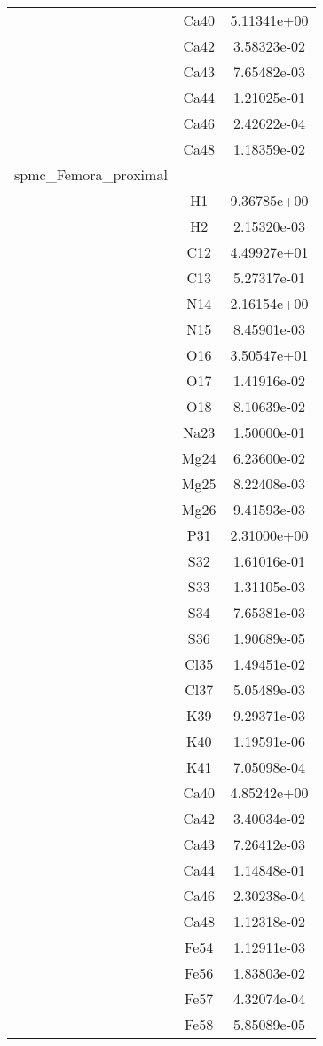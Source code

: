 \begin{centering}
\begin{longtable}{l c c}
& Ca40 & 5.11341e+00 \\ 
& Ca42 & 3.58323e-02 \\ 
& Ca43 & 7.65482e-03 \\ 
& Ca44 & 1.21025e-01 \\ 
& Ca46 & 2.42622e-04 \\ 
& Ca48 & 1.18359e-02 \\ 
\hline
spmc\_Femora\_proximal & & \\
\hline
& H1 & 9.36785e+00 \\ 
& H2 & 2.15320e-03 \\ 
& C12 & 4.49927e+01 \\ 
& C13 & 5.27317e-01 \\ 
& N14 & 2.16154e+00 \\ 
& N15 & 8.45901e-03 \\ 
& O16 & 3.50547e+01 \\ 
& O17 & 1.41916e-02 \\ 
& O18 & 8.10639e-02 \\ 
& Na23 & 1.50000e-01 \\ 
& Mg24 & 6.23600e-02 \\ 
& Mg25 & 8.22408e-03 \\ 
& Mg26 & 9.41593e-03 \\ 
& P31 & 2.31000e+00 \\ 
& S32 & 1.61016e-01 \\ 
& S33 & 1.31105e-03 \\ 
& S34 & 7.65381e-03 \\ 
& S36 & 1.90689e-05 \\ 
& Cl35 & 1.49451e-02 \\ 
& Cl37 & 5.05489e-03 \\ 
& K39 & 9.29371e-03 \\ 
& K40 & 1.19591e-06 \\ 
& K41 & 7.05098e-04 \\ 
& Ca40 & 4.85242e+00 \\ 
& Ca42 & 3.40034e-02 \\ 
& Ca43 & 7.26412e-03 \\ 
& Ca44 & 1.14848e-01 \\ 
& Ca46 & 2.30238e-04 \\ 
& Ca48 & 1.12318e-02 \\ 
& Fe54 & 1.12911e-03 \\ 
& Fe56 & 1.83803e-02 \\ 
& Fe57 & 4.32074e-04 \\ 
& Fe58 & 5.85089e-05 \\ 

\end{longtable}
\end{centering}
